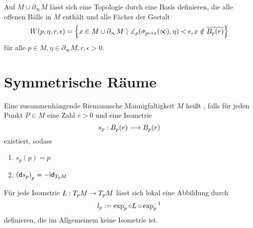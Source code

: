\documentclass{book}
\renewcommand{\d}{\textsf{d}}
\renewcommand{\l}[1]{\overline{#1}}
\begin{document}
\Bem{}
Auf $M\cup \partial_\infty M$ lässt sich eine Topologie durch eine Basis definieren, die alle offenen Bälle in $M$ enthält und alle Fächer der Gestalt
\[ W(p,\eta, r, \epsilon) = \set{x \in M \cup \partial_\infty M}{ \measuredangle_p(\sigma_{p\mapsto x}(\infty), \eta) < \epsilon, x \notin \l{B_p(r)} } \]
für alle $p \in M, \eta \in \partial_\infty M, r, \epsilon > 0$.



\newpage
\section{Symmetrische Räume}
Eine zusammenhängende Riemannsche Mannigfaltigkeit $M$ heißt , falls für jeden Punkt $P \in M$ eine Zahl $r > 0$ und eine Isometrie
\[ s_p : B_p(r) \overset{}{\longrightarrow} B_p(r) \]
existiert, sodass
\begin{enumerate}[1.)]
\item $s_p(p) = p$
\item $\klam{\d s_p}_{p} = - \id{T_pM}$
\end{enumerate}

\Bem{}
Für jede Isometrie $L : T_pM \overset{}{\rightarrow} T_pM$ lässt sich lokal eine Abbildung durch
\[ l_p := \exp_p \circ L \circ \exp_{p}^{-1} \]
definieren, die im Allgemeinem keine Isometrie ist.
\end{document}
